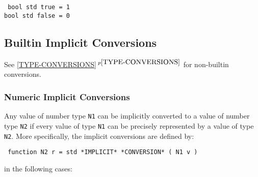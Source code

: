 \documentclass[12pt]{article}
\newcommand{\itemref}[1]{\ref{#1}$\,^{p\pageref{#1}}$}
\newenvironment{indpar}[1][0.3in]%
	{\begin{list}{}%
		     {\setlength{\itemsep}{0in}%
		      \setlength{\topsep}{0in}%
		      \setlength{\parsep}{1ex}%
		      \setlength{\labelwidth}{#1}%
		      \setlength{\leftmargin}{#1}%
		      \addtolength{\leftmargin}{\labelsep}}%
	 \item}%
	{\end{list}}
\begin{document}
\begin{indpar} \tt
bool std true = 1 \\
bool std false = 0
\end{indpar}


\subsection{Builtin Implicit Conversions}
\label{BUILTIN-IMPLICIT-CONVERSIONS}

See \itemref{TYPE-CONVERSIONS} for non-builtin conversions.

\subsubsection{Numeric Implicit Conversions}

Any value of number type {\tt N1} can be implicitly converted to a value
of number type {\tt N2} if every value of type {\tt N1} can be
precisely represented by a value of type {\tt N2}.  More specifically,
the implicit conversions are defined by:
\begin{indpar} \tt
function N2 r = std *IMPLICIT* *CONVERSION* ( N1 v )
\end{indpar}
in the following cases:
\end{document}
